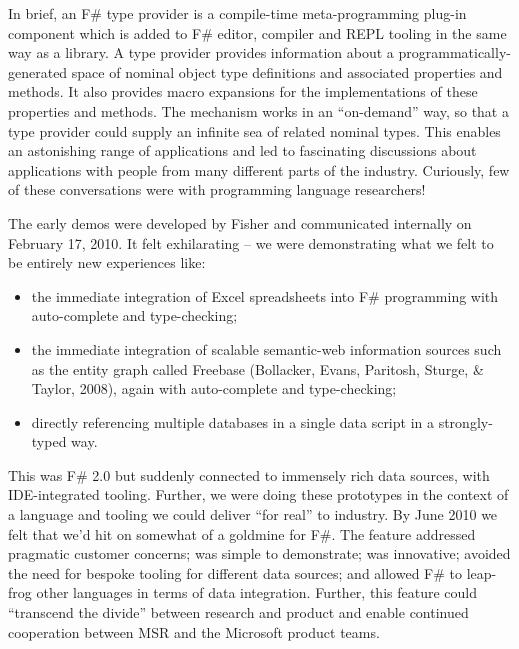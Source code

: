 \documentclass[acmsmall,review]{acmart}\settopmatter{printfolios=true,printccs=false,printacmref=false}
\begin{document}
In brief, an F\# type provider is a compile-time meta-programming plug-in component which is added to F\# editor, compiler and REPL tooling in the same way as a library. A type provider provides information about a programmatically-generated space of nominal object type definitions and associated properties and methods.  It also provides macro expansions for the implementations of these properties and methods. The mechanism works in an “on-demand” way, so that a type provider could supply an infinite sea of related nominal types.  This enables an astonishing range of applications and led to fascinating discussions about applications with people from many different parts of the industry.  Curiously, few of these conversations were with programming language researchers!

The early demos were developed by Fisher and communicated internally on February 17, 2010. It felt exhilarating – we were demonstrating what we felt to be entirely new experiences like:


\begin{itemize}
\item the immediate integration of Excel spreadsheets into F\# programming with auto-complete and type-checking;
\item the immediate integration of scalable semantic-web information sources such as the entity graph called Freebase (Bollacker, Evans, Paritosh, Sturge, \& Taylor, 2008), again with auto-complete and type-checking;
\item directly referencing multiple databases in a single data script in a strongly-typed way.
\end{itemize}


This was F\# 2.0 but suddenly connected to immensely rich data sources, with IDE-integrated tooling.  Further, we were doing these prototypes in the context of a language and tooling we could deliver “for real” to industry.  By June 2010 we felt that we’d hit on somewhat of a goldmine for F\#. The feature addressed pragmatic customer concerns; was simple to demonstrate; was innovative; avoided the need for bespoke tooling for different data sources; and allowed F\# to leap-frog other languages in terms of data integration. Further, this feature could “transcend the divide” between research and product and enable continued cooperation between MSR and the Microsoft product teams. 
\end{document}
